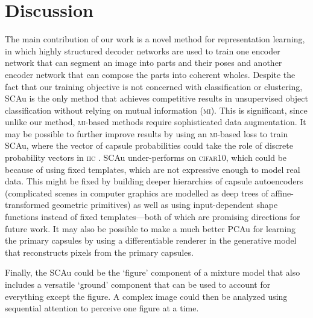 \section{Discussion}\vspace*{-5pt}
\label{sec:discussion}
    The main contribution of our work is a novel method for representation learning, in which highly structured decoder networks are used to train one encoder network that can segment an image into parts and their poses and another encoder network that can compose the parts into coherent wholes.
    Despite the fact that our training objective is not concerned with classification or clustering,
    \gls{SCAu} is the only method that achieves competitive results in unsupervised object classification without relying on mutual information (\textsc{mi}).
    This is significant, since unlike our method, \textsc{mi}-based methods require sophisticated data augmentation.
    It may be possible to further improve results by using an \textsc{mi}-based loss to train \gls{SCAu}, where the vector of capsule probabilities could take the role of discrete probability vectors in \textsc{iic} \citep{iic}.
    \gls{SCAu} under-performs on \textsc{cifar10}, which could be because of using fixed templates, which are not expressive enough to model real data.
    This might be fixed by building deeper hierarchies of capsule autoencoders (\!\eg complicated scenes in computer graphics are modelled as deep trees of affine-transformed geometric primitives) as well as using input-dependent shape functions instead of fixed templates---both of which are promising directions for future work.
    It may also be possible to make a much better \gls{PCAu} for learning the primary capsules by using a differentiable renderer in the generative model that reconstructs pixels from the primary capsules.
    
    Finally, the \gls{SCAu} could be the `figure' component of a mixture model that also includes a versatile `ground' component  that can be used to account for everything except the figure.  A complex image could then be analyzed using sequential attention to perceive one figure at a time. 